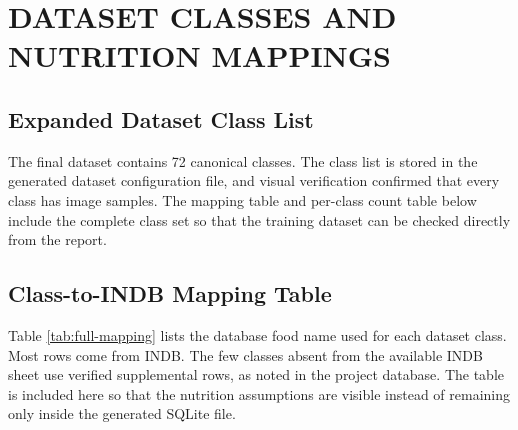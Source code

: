 \chapter{DATASET CLASSES AND NUTRITION MAPPINGS}

\section{Expanded Dataset Class List}

The final dataset contains 72 canonical classes. The class list is stored in the generated dataset configuration file, and visual verification confirmed that every class has image samples. The mapping table and per-class count table below include the complete class set so that the training dataset can be checked directly from the report.

\section{Class-to-INDB Mapping Table}

Table \ref{tab:full-mapping} lists the database food name used for each dataset class. Most rows come from INDB. The few classes absent from the available INDB sheet use verified supplemental rows, as noted in the project database. The table is included here so that the nutrition assumptions are visible instead of remaining only inside the generated SQLite file.

